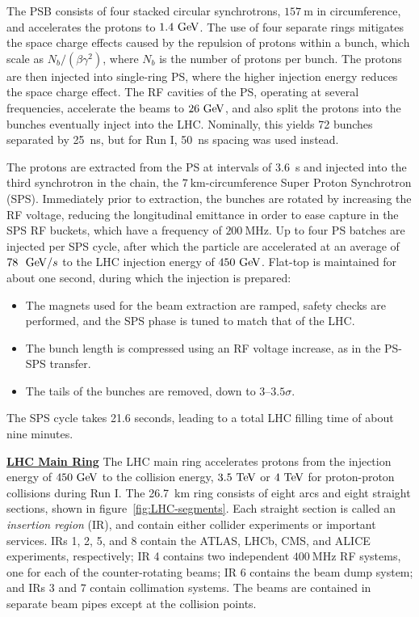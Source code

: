 The PSB consists of four stacked circular synchrotrons, $157~\mbox{m}$ in circumference, and accelerates the protons to $1.4 \GeV$. The use of four separate rings mitigates the space charge effects caused by the repulsion of protons within a bunch, which scale as $N_b/(\beta\gamma^2)$, where $N_b$ is the number of protons per bunch. The protons are then injected into single-ring PS, where the higher injection energy reduces the space charge effect. The RF cavities of the PS, operating at several frequencies, accelerate the beams to $26 \GeV$, and also split the protons into the bunches eventually inject into the LHC. Nominally, this yields 72 bunches separated by 25~ns, but for Run I, 50~ns spacing was used instead. 

The protons are extracted from the PS at intervals of 3.6~s and injected into the third synchrotron in the chain, the $7~\mbox{km}$-circumference Super Proton Synchrotron (SPS). Immediately prior to extraction, the bunches are rotated by increasing the RF voltage, reducing the longitudinal emittance in order to ease capture in the SPS RF buckets, which have a frequency of $200~\mbox{MHz}$.  Up to four PS batches are injected per SPS cycle, after which the particle are accelerated at an average of $78~\GeV/s$ to the LHC injection energy of $450 \GeV$. Flat-top is maintained for about one second, during which the injection is prepared:

\begin{itemize}
	\item The magnets used for the beam extraction are ramped, safety checks are performed, and the SPS phase is tuned to match that of the LHC.
	\item The bunch length is compressed using an RF voltage increase, as in the PS-SPS transfer.
	\item The tails of the bunches are removed, down to $3$--$3.5\sigma$.
\end{itemize}

The SPS cycle takes 21.6 seconds, leading to a total LHC filling time of about nine minutes.

\underline{\textbf{LHC Main Ring}}
The LHC main ring accelerates protons from the injection energy of $450 \GeV$ to the collision energy, $3.5 \TeV$ or $4 \TeV$ for proton-proton collisions during Run I. The 26.7~km ring consists of eight arcs and eight straight sections, shown in figure~\ref{fig:LHC-segments}. Each straight section is called an \emph{insertion region} (IR), and contain either collider experiments or important services. IRs 1, 2, 5, and 8 contain the ATLAS, LHCb, CMS, and ALICE experiments, respectively; IR 4 contains two independent $400~\mbox{MHz}$ RF systems, one for each of the counter-rotating beams; IR 6 contains the beam dump system; and IRs 3 and 7 contain collimation systems. The beams are contained in separate beam pipes except at the collision points.

